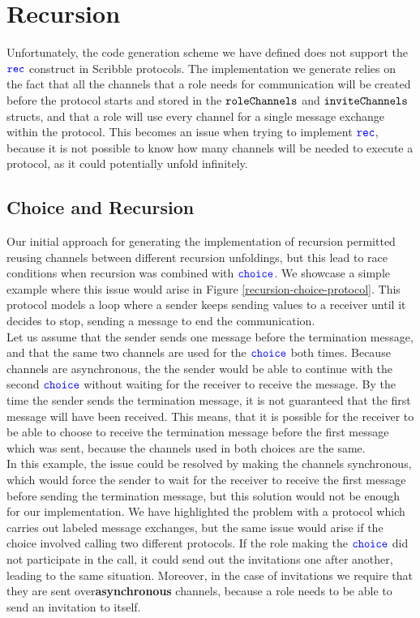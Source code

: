 \documentclass[12pt,twoside]{report}
\begin{document}
\section{Recursion}\label{recursion-limitations}
Unfortunately, the code generation scheme we have defined does not support the ${\color{blue}\mathtt{rec}}$ construct in Scribble protocols. The implementation we generate relies on the fact that all the channels that a role needs for communication will be created before the protocol starts and stored in the ${\mathtt{roleChannels}}$ and ${\mathtt{inviteChannels}}$ structs, and that a role will use every channel for a single message exchange within the protocol. This becomes an issue when trying to implement ${\color{blue}\mathtt{rec}}$, because it is not possible to know how many channels will be needed to execute a protocol, as it could potentially unfold infinitely.


\subsection{Choice and Recursion}
Our initial approach for generating the implementation of recursion permitted reusing channels between different recursion unfoldings, but this lead to race conditions when recursion was combined with ${\color{blue}\mathtt{choice}}$. We showcase a simple example where this issue would arise in Figure \ref{recursion-choice-protocol}. This protocol models a loop where a sender keeps sending values to a receiver until it decides to stop, sending a message to end the communication.\\

Let us assume that the sender sends one message before the termination message, and that the same two channels are used for the ${\color{blue}\mathtt{choice}}$ both times. Because channels are asynchronous, the the sender would be able to continue with the second ${\color{blue}\mathtt{choice}}$ without waiting for the receiver to receive the message. By the time the sender sends the termination message, it is not guaranteed that the first message will have been received. This means, that it is possible for the receiver to be able to choose to receive the termination message before the first message which was sent, because the channels used in both choices are the same.\\

In this example, the issue could be resolved by making the channels synchronous, which would force the sender to wait for the receiver to receive the first message before sending the termination message, but this solution would not be enough for our implementation. We have highlighted the problem with a protocol which carries out labeled message exchanges, but the same issue would arise if the choice involved calling two different protocols. If the role making the ${\color{blue}\mathtt{choice}}$ did not participate in the call, it could send out the invitations one after another, leading to the same situation. Moreover, in the case of invitations we require that they are sent over\textbf{asynchronous} channels, because a role needs to be able to send an invitation to itself. \\
\end{document}
